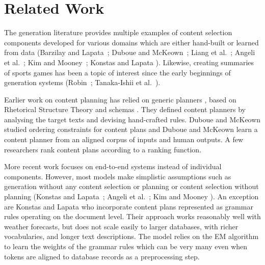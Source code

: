 \documentclass[letterpaper]{article} \usepackage{aaai19}  \usepackage{times}  \usepackage{helvet}  \usepackage{courier}  \usepackage{url}  \usepackage{graphicx}  \frenchspacing  \setlength{\pdfpagewidth}{8.5in}  \setlength{\pdfpageheight}{11in}  \graphicspath{ {images/} }
\begin{document}
\section{Related Work}





The generation literature provides multiple examples of content
selection components developed for various domains which are either
hand-built
\cite{P83-1022,mckeown1992text,Reiter:1997:BAN:974487.974490,W03-1016}
or learned from data (Barzilay and Lapata~\citeyear{H05-1042}; Duboue
and McKeown~\citeyear{duboue2001empirically,W03-1016}; Liang et
al.~\citeyear{P09-1011}; Angeli et al.~\citeyear{D10-1049}; Kim and
Mooney~\citeyear{C10-2062}; Konstas and
Lapata \citeyear{Konstas:2013:GMC:2591248.2591256}). Likewise,
creating summaries of sports games has been a topic of interest since
the early beginnings of generation systems
(Robin~\citeyear{robin1994revision}; Tanaka-Ishii et
al.~\citeyear{P98-2209}).

Earlier work on content planning has relied on generic planners \cite{dale1988generating},
based on Rhetorical Structure Theory \cite{hovy1993automated} and schemas \cite{mckeown1997language}.
They defined content planners by analysing the target texts and devising hand-crafted rules. 
Duboue and McKeown 
studied ordering constraints for content plans and Duboue and McKeown  learn a content planner 
from an aligned corpus of inputs and human outputs. 
A few researchers \cite{mellish1998experiments,karamanis2004entity} rank 
content plans according to a ranking function.

More recent work focuses on end-to-end systems instead of individual components.
However, most models make simplistic assumptions such as generation
without any content selection or planning \cite{Belz:2008:AGW:1520025.1520026,N07-1022} 
or content selection without planning  (Konstas and
Lapata~\citeyear{N12-1093}; Angeli et al.~\citeyear{D10-1049}; Kim and
Mooney \citeyear{C10-2062}).
An exception are Konstas and Lapata
 who incorporate content
plans represented as grammar rules operating on the document
level. Their approach works reasonably well with weather forecasts,
but does not scale easily to larger databases, with richer vocabularies, and
longer text descriptions. The model relies on the EM algorithm
\cite{dempster1977maximum} to learn the weights of the grammar rules
which can be very many even when tokens are aligned to database
records as a preprocessing step.
\end{document}
